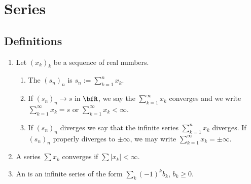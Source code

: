 \chapter*{Series}
\vspace{12pt}
\section*{Definitions}
    \begin{enumerate}[label = (\arabic*)]
        \item Let $(x_k)_k$ be a sequence of real numbers.
            \begin{enumerate}[label = (\roman*)]
                \item The  $(s_n)_n$ is $s_n := \sum_{k = 1}^n x_k$.
                \item If $(s_n)_n \rightarrow s$ in $\bfR$, we say the   $\sum_{k = 1}^\infty x_k$ converges and we write $\sum_{k = 1}^\infty x_k = s$ or $\sum_{k = 1}^\infty x_k < \infty$.
                \item If $(s_n)_n$ diverges we say that the infinite series $\sum_{k = 1}^n x_k$ diverges. If $(s_n)_n$ properly diverges to $\pm\infty$, we may write $\sum_{k = 1}^\infty x_k = \pm\infty$.
            \end{enumerate}

        \item A series $\sum x_k$ converges  if $\sum |x_k| < \infty$.
        
        \item An  is an infinite series of the form $\sum_k (-1)^k b_k$, $b_k \geq 0$.
    \end{enumerate}

